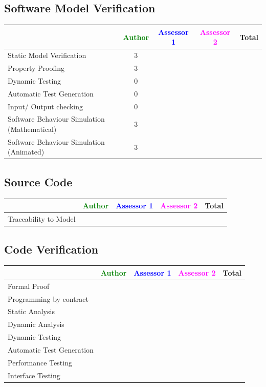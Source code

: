 \subsection{Software Model Verification	}


\begin{tabular}{|l | c | c | c | c|}
\hline
& \textcolor{green}{Author} & \textcolor{blue}{Assessor 1} & \textcolor{magenta}{Assessor 2} & Total \\
\hline 
Static Model Verification & 3& & &  \\
\hline
Property Proofing & 3& & &  \\
\hline
Dynamic Testing & 0& & &  \\
\hline
Automatic Test Generation & 0& & &  \\
\hline
Input/ Output checking & 0& & &  \\
\hline
Software Behaviour Simulation (Mathematical) & 3& & &  \\
\hline
Software Behaviour Simulation (Animated) & 3& & &  \\
\hline
\end{tabular}


\subsection{Source Code}


\begin{tabular}{|l | c | c | c | c|}
\hline
& \textcolor{green}{Author} & \textcolor{blue}{Assessor 1} & \textcolor{magenta}{Assessor 2} & Total \\
\hline 
Traceability to Model & & & &  \\
\hline
\end{tabular}


\subsection{Code Verification	}


\begin{tabular}{|l | c | c | c | c|}
\hline
& \textcolor{green}{Author} & \textcolor{blue}{Assessor 1} & \textcolor{magenta}{Assessor 2} & Total \\
\hline 
Formal Proof & & & &  \\
\hline
Programming by contract & & & &  \\
\hline
Static Analysis & & & &  \\
\hline
Dynamic Analysis & & & &  \\
\hline
Dynamic Testing & & & &  \\
\hline
Automatic Test Generation & & & &  \\
\hline
Performance Testing & & & &  \\
\hline
Interface Testing & & & &  \\
\hline
\end{tabular}

